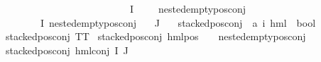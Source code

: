 \begin{isabellebody}
\ \ \ \ \ \ \ \ \ \ \ \ \ \ \ \ \ \ \ \ \ {\isacharparenleft}{\kern0pt}{\isasymforall}{\isasympsi}\ {\isasymin}\ {\isacharparenleft}{\kern0pt}{\isasymPhi}\ {\isacharbackquote}{\kern0pt}\ I{\isacharparenright}{\kern0pt}{\isachardot}{\kern0pt}\ {\isasympsi}\ {\isasymnoteq}\ {\isasymphi}\ {\isasymlongrightarrow}\ nested{\isacharunderscore}{\kern0pt}empty{\isacharunderscore}{\kern0pt}pos{\isacharunderscore}{\kern0pt}conj\ {\isasympsi}{\isacharparenright}{\kern0pt}{\isacharparenright}{\kern0pt}{\isacharparenright}{\kern0pt}\ {\isasymor}\isanewline
\ \ \ {\isacharparenleft}{\kern0pt}{\isasymforall}{\isasympsi}\ {\isasymin}\ {\isacharparenleft}{\kern0pt}{\isasymPhi}\ {\isacharbackquote}{\kern0pt}\ I{\isacharparenright}{\kern0pt}{\isachardot}{\kern0pt}\ nested{\isacharunderscore}{\kern0pt}empty{\isacharunderscore}{\kern0pt}pos{\isacharunderscore}{\kern0pt}conj\ {\isasympsi}{\isacharparenright}{\kern0pt}{\isacharparenright}{\kern0pt}{\isachardoublequoteclose}\isanewline
{\isachardoublequoteopen}{\isacharparenleft}{\kern0pt}{\isasymPhi}\ {\isacharbackquote}{\kern0pt}\ J{\isacharparenright}{\kern0pt}\ {\isacharequal}{\kern0pt}\ {\isacharbraceleft}{\kern0pt}{\isacharbraceright}{\kern0pt}{\isachardoublequoteclose}\isanewline
\isanewline
{}\isamarkupfalse%
\ stacked{\isacharunderscore}{\kern0pt}pos{\isacharunderscore}{\kern0pt}conj\ {\isacharcolon}{\kern0pt}{\isacharcolon}{\kern0pt}\ {\isachardoublequoteopen}{\isacharparenleft}{\kern0pt}{\isacharprime}{\kern0pt}a{\isacharcomma}{\kern0pt}\ {\isacharprime}{\kern0pt}i{\isacharparenright}{\kern0pt}\ hml\ {\isasymRightarrow}\ bool{\isachardoublequoteclose}\isanewline
\ \ \ \isanewline
{\isachardoublequoteopen}stacked{\isacharunderscore}{\kern0pt}pos{\isacharunderscore}{\kern0pt}conj\ TT{\isachardoublequoteclose}\ {\isacharbar}{\kern0pt}\isanewline
{\isachardoublequoteopen}stacked{\isacharunderscore}{\kern0pt}pos{\isacharunderscore}{\kern0pt}conj\ {\isacharparenleft}{\kern0pt}hml{\isacharunderscore}{\kern0pt}pos\ {\isacharunderscore}{\kern0pt}\ {\isasympsi}{\isacharparenright}{\kern0pt}{\isachardoublequoteclose}\ \ {\isachardoublequoteopen}nested{\isacharunderscore}{\kern0pt}empty{\isacharunderscore}{\kern0pt}pos{\isacharunderscore}{\kern0pt}conj\ {\isasympsi}{\isachardoublequoteclose}\ {\isacharbar}{\kern0pt}\isanewline
{\isachardoublequoteopen}stacked{\isacharunderscore}{\kern0pt}pos{\isacharunderscore}{\kern0pt}conj\ {\isacharparenleft}{\kern0pt}hml{\isacharunderscore}{\kern0pt}conj\ I\ J\ {\isasymPhi}{\isacharparenright}{\kern0pt}{\isachardoublequoteclose}\isanewline

\end{isabellebody}
